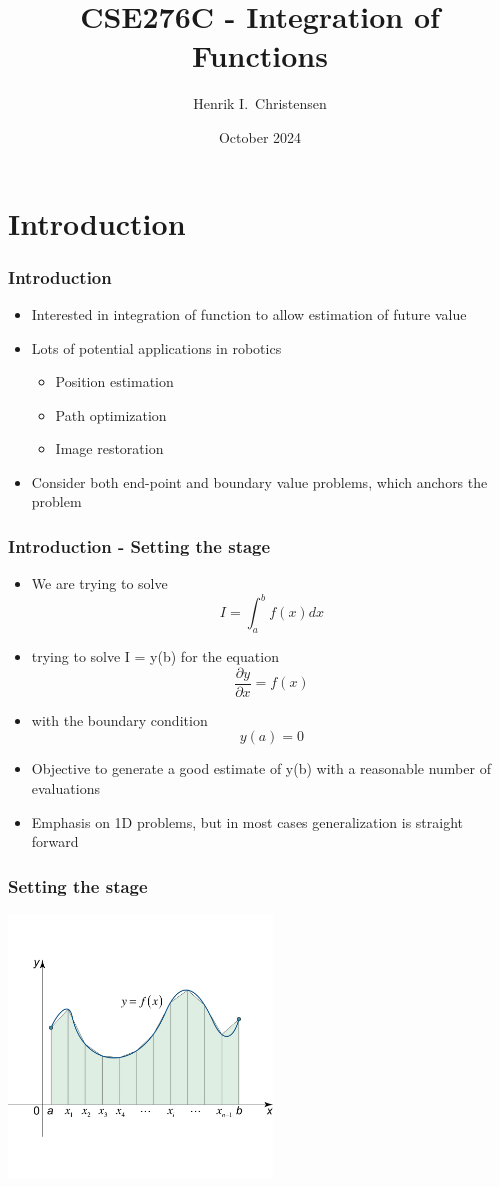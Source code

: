 \documentclass[10pt]{beamer}
\title[Math for Robotics] %
{CSE276C - Integration of Functions}
\author[H.~I. Christensen] %
{Henrik I.~Christensen}
\institute[UCSD] %
{
  \begin{minipage}[c]{.2\textwidth}
    \texttt{[image: ucsealnew]}%
  \end{minipage}%
  \begin{minipage}[c]{.6\textwidth}
    \small
      Computer Science and Engineering\\
      University of California, San Diego\\
      \myemph{\url{http://cri.ucsd.edu}}\\          

  \end{minipage}
}
\date[Oct 2024]%
{\small%
  October 2024}
\begin{document}
  


\begin{frame}[plain]
  \titlepage
\end{frame}

\section{Introduction}

\begin{frame}
  \frametitle{Introduction}
  \begin{itemize}
  \item Interested in integration of function to allow estimation of
    future value
  \item Lots of potential applications in robotics
    \begin{itemize}
    \item Position estimation
    \item Path optimization
    \item Image restoration
    \end{itemize}
  \item Consider both end-point and boundary value problems, which
    anchors the problem
  \end{itemize}
\end{frame}


\begin{frame}
  \frametitle{Introduction - Setting the stage}
  \begin{itemize}
  \item We are trying to solve
    \[
      I = \int_a^b f(x) dx
    \]
    \item trying to solve I = y(b) for the equation
    \[
      \frac{\partial y}{\partial x} = f(x)
    \] 
  \item with the boundary condition
    \[
      y(a) = 0
    \]
  \item Objective to generate a good estimate of y(b) with a
    reasonable number of evaluations
  \item Emphasis on 1D problems, but in most cases generalization is
    straight forward
  \end{itemize}
\end{frame}

\begin{frame}
  \frametitle{Setting the stage}
  \centerline{\includegraphics[height=7cm]{trapezoid}}
\end{frame}
\end{document}
